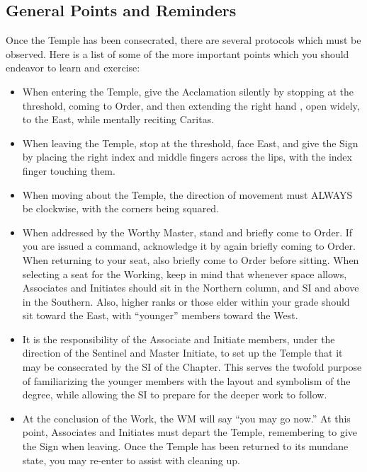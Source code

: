 \subsection{General Points and Reminders}

Once the Temple has been consecrated, there are several protocols which 
must be observed. Here is a list of some of the more important points which you 
should endeavor to learn and exercise:

\begin{itemize}
\item When entering the Temple, give the Acclamation silently by stopping at the 
threshold, coming to Order, and then extending the right hand , open 
widely, to the East, while mentally reciting Caritas. 
\item When leaving the Temple, stop at the threshold, face East, and give the Sign 
by placing the right index and middle fingers across the lips, with the index 
finger touching them. 
\item When moving about the Temple, the direction of movement must ALWAYS 
be clockwise, with the corners being squared. 
\item When addressed by the Worthy Master, stand and briefly come to Order. If 
you are issued a command, acknowledge it by again briefly coming to Order. 
When returning to your seat, also briefly come to Order before sitting. 
When selecting a seat for the Working, keep in mind that whenever 
space allows, Associates and Initiates should sit in the Northern column, 
and SI and above in the Southern. Also, higher ranks or those elder within 
your grade should sit toward the East, with ``younger'' members toward the 
West. 
\item It is the responsibility of the Associate and Initiate members, under the 
direction of the Sentinel and Master Initiate, to set up the Temple that it 
may be consecrated by the SI of the Chapter. This serves the twofold 
purpose of familiarizing the younger members with the layout and 
symbolism of the degree, while allowing the SI to prepare for the deeper 
work to follow. 
\item At the conclusion of the Work, the WM will say ``you may go now.'' At this 
point, Associates and Initiates must depart the Temple, remembering to give 
the Sign when leaving. Once the Temple has been returned to its mundane 
state, you may re-enter to assist with cleaning up. 

\end{itemize}
